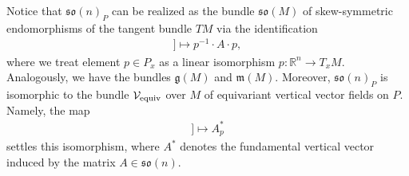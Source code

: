 \documentclass[10pt,a4paper]{amsart}
\numberwithin{equation}{section}
\begin{document}
Notice that $\mathfrak{so}(n)_P$ can be realized as the bundle $\mathfrak{so}(M)$ of skew-symmetric endomorphisms of the tangent bundle $TM$ via the identif\/ication
\begin{gather*}
[[p,A]]\mapsto p^{-1}\cdot A\cdot p,
\end{gather*}
where we treat element $p\in P_x$ as a linear isomorphism $p\colon \mathbb{R}^n\to T_xM$. Analogously, we have the bundles $\mathfrak{g}(M)$ and $\mathfrak{m}(M)$. Moreover, $\mathfrak{so}(n)_P$ is isomorphic to the bundle $\mathcal{V}_{\rm equiv}$ over $M$ of equivariant vertical vector f\/ields on $P$. Namely, the map
\begin{gather*}
[[p,A]]\mapsto A^{\ast}_p
\end{gather*}
settles this isomorphism, where $A^{\ast}$ denotes the fundamental vertical vector induced by the matrix $A\in\mathfrak{so}(n)$.
\end{document}
